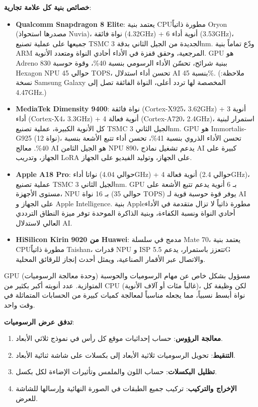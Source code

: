 \textbf{خصائص بنية كل علامة تجارية}:

\begin{itemize}
  \item \textbf{Qualcomm Snapdragon 8 Elite}: يعتمد بنية CPUمطورة ذاتياً Oryon (مصدرها استحواذ Nuvia)، نواة فائقة (4.32GHz) + 6 أنوية أداء (3.53GHz)، جميعها على عملية تصنيع TSMC الجديدة من الجيل الثاني بدقة 3nm. ودّع تماماً بنية ARM المرجعية، وحقق قفزة في الأداء أحادي النواة ومتعدد الأنوية. GPU هو Adreno 830 ببنية شرائح، تحسّن الأداء الرسومي بنسبة 40\%، وقوة حوسبة Hexagon NPU حوالي 45 TOPS، تحسن أداء استدلال AI بنسبة 45\%. (ملاحظة: نسخة Samsung Galaxy المخصصة لها تردد أعلى، النواة الفائقة تصل إلى 4.47GHz.)
  \item \textbf{MediaTek Dimensity 9400}: نواة فائقة (Cortex-X925، 3.62GHz) + 3 أنوية أداء (Cortex-X4، 3.3GHz) + 4 أنوية فعالة (Cortex-A720، 2.4GHz)، استمرار لبنية كل الأنوية الكبيرة، عملية تصنيع TSMC الجيل الثاني 3nm. GPU هو Immortalis-G925 (12 نواة)، تحسن الأداء الذروي بنسبة 41\%، تحسن أداء تتبع الأشعة بنسبة 40\%. معالج AI هو الجيل الثامن NPU 890، يدعم تشغيل نماذج AI كبيرة على الجهاز، وتدريب LoRA على الجهاز، وتوليد الفيديو على الجهاز.
  \item \textbf{Apple A18 Pro}: نواتا أداء (حوالي 4.04GHz) + 4 أنوية فعالة (حوالي 2.4GHz)، عملية تصنيع TSMC الجيل الثاني 3nm. GPU بـ 6 أنوية يدعم تتبع الأشعة على مستوى الأجهزة، NPU بـ 16 نواة (حوالي 35 TOPS) يوفر قوة حوسبة قوية لـ AI على الجهاز و Apple Intelligence. بنية Appleمطورة ذاتياً لا تزال متقدمة في الأداء أحادي النواة ونسبة الكفاءة، وبنية الذاكرة الموحدة توفر ميزة النطاق الترددي العالي لاستدلال AI.
  \item \textbf{HiSilicon Kirin 9020 من Huawei}: مدمج في سلسلة Mate 70، يعتمد بنية CPUمطورة ذاتياً Taishan، قدرات NPU و ISP تتعزز باستمرار، يدعم 5.5G والاتصال عبر الأقمار الصناعية، ويمثل أحدث إنجاز للرقائق المحلية.
\end{itemize}


GPU (وحدة معالجة الرسوميات) مسؤول بشكل خاص عن مهام الرسوميات والحوسبة المتوازية. عدد أنويته أكبر بكثير من CPU (غالباً مئات أو آلاف الأنوية)، لكن وظيفة كل نواة أبسط نسبياً، مما يجعله مناسباً لمعالجة كميات كبيرة من الحسابات المتماثلة في وقت واحد.

\textbf{تدفق عرض الرسوميات}:

\begin{enumerate}
  \item \textbf{معالجة الرؤوس}: حساب إحداثيات موقع كل رأس في نموذج ثلاثي الأبعاد.
  \item \textbf{التنقيط}: تحويل الرسوميات ثلاثية الأبعاد إلى بكسلات على شاشة ثنائية الأبعاد.
  \item \textbf{تظليل البكسلات}: حساب اللون والملمس وتأثيرات الإضاءة لكل بكسل.
  \item \textbf{الإخراج والتركيب}: تركيب جميع الطبقات في الصورة النهائية وإرسالها للشاشة للعرض.
\end{enumerate}

